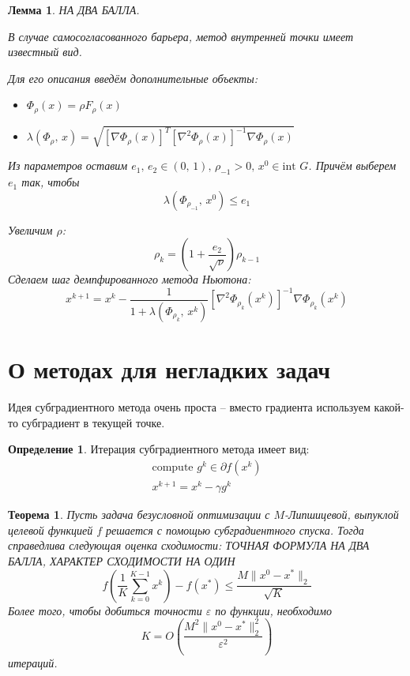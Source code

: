 \documentclass[a4paper,12pt]{article}
\renewcommand{\leq}{\ensuremath{\leqslant}}
\theoremstyle{plain}
\newtheorem{theorem}{Теорема}[section]
\newtheorem{lemma}{Лемма}[section]
\theoremstyle{definition}
\newtheorem{definition}{Определение}[section]
\theoremstyle{remark}
\begin{document}
\begin{lemma}
  НА ДВА БАЛЛА.

  В случае самосогласованного барьера, метод внутренней точки имеет известный вид.

  Для его описания введём дополнительные объекты:
  \begin{itemize}
    \item $\Phi_\rho(x) = \rho F_\rho(x)$
    \item $\lambda(\Phi_\rho,\, x) = \sqrt{[\nabla \Phi_\rho(x)]^T[\nabla^2\Phi_\rho(x)]^{-1}\nabla\Phi_\rho(x)}$
  \end{itemize}

  Из параметров оставим $e_1,\, e_2 \in (0,\, 1),\, \rho_{-1} > 0,\, x^0 \in \text{int }G$. Причём выберем $e_1$ так, чтобы
  \[
    \lambda(\Phi_{\rho_{-1}},\,x^0) \leq e_1
  \]

  Увеличим $\rho$:
  \[
    \rho_k = \left(1 + \frac{e_2}{\sqrt{\nu}}\right)\rho_{k - 1}
  \]
  Сделаем шаг демпфированного метода Ньютона:
  \[
    x^{k + 1} = x^k - \frac{1}{1 + \lambda(\Phi_{\rho_k},\, x^k)}[\nabla^2\Phi_{\rho_k}(x^k)]^{-1}\nabla \Phi_{\rho_k}(x^k)
  \]
\end{lemma}

\section{О методах для негладких задач}
Идея субградиентного метода очень проста -- вместо градиента используем какой-то субградиент в текущей точке.

\begin{definition}
  Итерация субградиентного метода имеет вид:
  \begin{align*}
    \text{compute }g^k \in \partial f(x^k)\\
    x^{k + 1} = x^k - \gamma g^k
  \end{align*}
\end{definition}

\begin{theorem}
  Пусть задача безусловной оптимизации с $M$-Липшицевой, выпуклой целевой функцией $f$ решается с помощью субградиентного спуска. Тогда справедлива следующая оценка сходимости: ТОЧНАЯ ФОРМУЛА НА ДВА БАЛЛА, ХАРАКТЕР СХОДИМОСТИ НА ОДИН
  \[
    f\left(\frac{1}{K}\sum_{k = 0}^{K - 1}x^k\right) - f(x^*) \leq \frac{M\|x^0 - x^*\|_2}{\sqrt{K}}
  \]
  Более того, чтобы добиться точности $\varepsilon$ по функции, необходимо
  \[
    K = O\left(\frac{M^2\|x^0 - x^*\|_2^2}{\varepsilon^2}\right)
  \]
  итераций.
\end{theorem}
\end{document}
